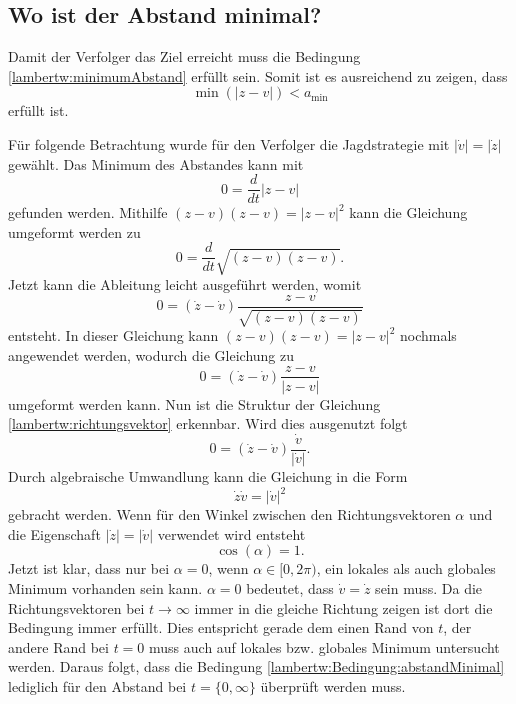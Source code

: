\subsection{Wo ist der Abstand minimal?}
%
Damit der Verfolger das Ziel erreicht muss die Bedingung \eqref{lambertw:minimumAbstand} erfüllt sein.
Somit ist es ausreichend zu zeigen, dass
\begin{equation}
    \operatorname{min}(|z-v|)<a_\text{min}
    \label{lambertw:Bedingung:abstandMinimal}
\end{equation}
erfüllt ist.

Für folgende Betrachtung wurde für den Verfolger die Jagdstrategie mit $|\dot{v}|=|\dot{z}|$ gewählt.
Das Minimum des Abstandes kann mit
\begin{equation}
    0=\frac{d}{dt}|z-v|
\end{equation}
gefunden werden.
Mithilfe $(z-v)(z-v)=|z-v|^2$ kann die Gleichung umgeformt werden zu
\begin{equation}
    0=\frac{d}{dt} \sqrt{(z-v)(z-v)}
    \text{.}
\end{equation}
Jetzt kann die Ableitung leicht ausgeführt werden, womit
\begin{equation}
    0=(\dot{z}-\dot{v})\frac{z-v}{\!\sqrt{(z-v)(z-v)}}
\end{equation}
entsteht.
In dieser Gleichung kann $(z-v)(z-v)=|z-v|^2$ nochmals angewendet werden, wodurch die Gleichung zu
\begin{equation}
    0=(\dot{z}-\dot{v})\frac{z-v}{|z-v|}
\end{equation}
umgeformt werden kann.
Nun ist die Struktur der Gleichung \eqref{lambertw:richtungsvektor} erkennbar.
Wird dies ausgenutzt folgt
\begin{equation}
    0=(\dot{z}-\dot{v})\frac{\dot{v}}{|\dot{v}|}
    \text{.}
\end{equation}
Durch algebraische Umwandlung kann die Gleichung in die Form
\begin{equation}
    \dot{z}\dot{v}=|\dot{v}|^2
\end{equation}
gebracht werden.
Wenn für den Winkel zwischen den Richtungsvektoren $\alpha$ und die Eigenschaft $|\dot{z}|=|\dot{v}|$ verwendet wird entsteht
\begin{equation}
    \cos(\alpha)=1
    \text{.}
\end{equation}
Jetzt ist klar, dass nur bei $\alpha=0$, wenn $\alpha \in [0,2\pi)$, ein lokales als auch globales Minimum vorhanden sein kann.
$\alpha=0$ bedeutet, dass $\dot{v}=\dot{z}$ sein muss.
Da die Richtungsvektoren bei $t\rightarrow\infty$ immer in die gleiche Richtung zeigen ist dort die Bedingung immer erfüllt.
Dies entspricht gerade dem einen Rand von $t$, der andere Rand bei $t=0$ muss auch auf lokales bzw. globales Minimum untersucht werden.
Daraus folgt, dass die Bedingung \eqref{lambertw:Bedingung:abstandMinimal} lediglich für den Abstand bei $t=\{0, \infty\}$ überprüft werden muss.
